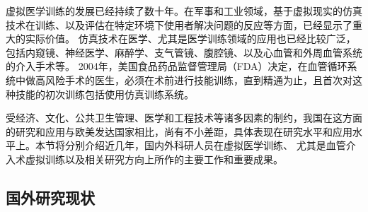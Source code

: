 
虚拟医学训练的发展已经持续了数十年\cite{Dawson1998}。在军事和工业领域，基于虚拟现实的仿真技术在训练、以及评估在特定环境下使用者解决问题的反应等方面，已经显示了重大的实际价值\cite{Goodwin1978Simulator}\cite{Rolfe1986Simulators}\cite{Ressler1999Simulators}\cite{Wachtel1985Simulators}。
仿真技术在医学、尤其是医学训练领域的应用也已经比较广泛，包括内窥镜\cite{Vining1995Endoscopy}\cite{Preminger1996Endoscopy}、神经医学\cite{Kockro2000Neurosurgery}\cite{Cotin2005EVE}\cite{Ma2007NeuroCath}、麻醉学\cite{Gaba1988Anesthesiology}、支气管镜\cite{Vining1996Bronchoscopy}、腹腔镜\cite{Hon1994Laparoscopy}\cite{Derossis1998Laparoscopy}、以及心血管和外周血管系统的介入手术\cite{Chui1998ICard}\cite{Cotin2000ICTS}\cite{Tan2012NUDT}等。
2004年，美国食品药品监督管理局（FDA）决定，在血管循环系统中做高风险手术的医生，必须在术前进行技能训练，直到精通为止，且首次对这种技能的初次训练包括使用仿真训练系统\cite{Dawson2006Medicine}。

受经济、文化、公共卫生管理、医学和工程技术等诸多因素的制约，我国在这方面的研究和应用与欧美发达国家相比，尚有不小差距，具体表现在研究水平和应用水平上。本节将分别介绍近几年，国内外科研人员在虚拟医学训练、
尤其是血管介入术虚拟训练以及相关研究方向上所作的主要工作和重要成果。

\subsection{国外研究现状}

